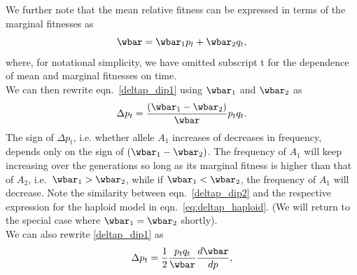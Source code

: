 We further note that the mean relative fitness can be expressed in terms of the marginal fitnesses as
\begin{equation}
	\label{eq:meanFitInTermsOfMargFit}
	\wbar = \wbar_1 p_t + \wbar_2 q_t,
\end{equation}
where, for notational simplicity, we have omitted subscript t for the dependence of mean and marginal fitnesses on time.\\

We can then rewrite eqn.\ \eqref{deltap_dip1} using $\wbar_1$ and $\wbar_2$ as
\begin{equation}
	\Delta p_t = \frac{ (\wbar_1-\wbar_2)}{\wbar} p_t q_t.
	\label{deltap_dip2}
\end{equation}
The sign of $\Delta p_t$, i.e. whether allele $A_1$ increases of decreases
in frequency, depends only on the sign of
$(\wbar_1-\wbar_2)$. 
The frequency of $A_1$ will keep increasing over the generations so
long as its marginal fitness is higher than that of $A_2$,
i.e.\ $\wbar_1 > \wbar_2$, while if $\wbar_1 < \wbar_2$, the
frequency of $A_1$ will decrease. Note the similarity between eqn.\ \eqref{deltap_dip2} and the respective expression for the haploid model in eqn.\ \eqref{eq:deltap_haploid}. (We will return to the
special case where $\wbar_1 = \wbar_2$ shortly).\\

We can also rewrite \eqref{deltap_dip1} as
\begin{equation}
\Delta p_t =\frac{1}{2} \frac{p_tq_t}{\wbar} \frac{d \wbar}{dp}, 
\label{deltap_dip3}
\end{equation}

